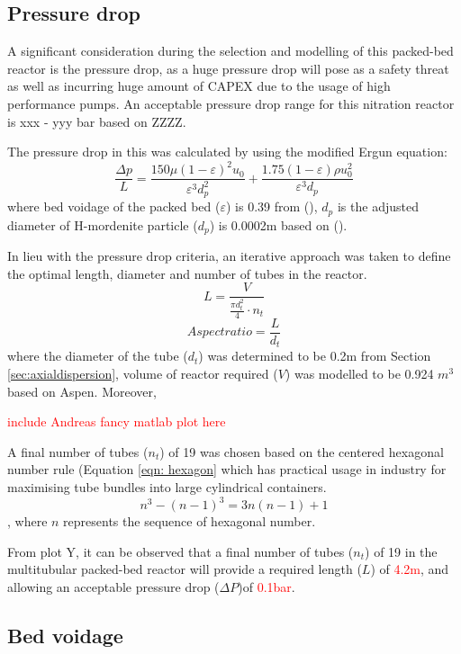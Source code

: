 \subsection{Pressure drop}

A significant consideration during the selection and modelling of this packed-bed reactor is the pressure drop, as a huge pressure drop will pose as a safety threat as well as incurring huge amount of CAPEX due to the usage of high performance pumps. An acceptable pressure drop range for this nitration reactor is xxx - yyy bar based on ZZZZ. 

The pressure drop in this was calculated by using the modified Ergun equation: 
\begin{equation}
    \frac{\Delta p}{L} = \frac{150 \mu (1- \varepsilon)^2 u_0}{\varepsilon^3 d_p^2} + \frac{1.75(1-\varepsilon)\rho u_0^2}{\varepsilon^3 d_p}
    \label{eqn:ergun}
\end{equation}
where bed voidage of the packed bed ($\varepsilon$) is 0.39 from (), $d_p$ is the adjusted diameter of H-mordenite particle ($d_p$) is 0.0002m based on (). 

In lieu with the pressure drop criteria, an iterative approach was taken to define the optimal length, diameter and number of tubes in the reactor. 
\begin{equation}
    L= \frac{V}{\frac{\pi d_t^2}{4}\cdot n_t}
    \label{eqn:pressuredrop}
\end{equation}
\begin{equation}
    Aspect ratio = \frac{L}{d_t}
    \label{eqn:aspectratio}
\end{equation}
where the diameter of the tube ($d_t$) was determined to be 0.2m from Section \ref{sec:axialdispersion}, volume of reactor required ($V$) was modelled to be 0.924 $m^3$ based on Aspen. Moreover, 

\textcolor{red}{include Andreas fancy matlab plot here}

A final number of tubes ($n_t$) of 19 was chosen based on the centered hexagonal number rule (Equation \ref{eqn: hexagon} which has practical usage in industry for maximising tube bundles into large cylindrical containers. 
\begin{equation}
    n^3 - (n-1)^3 = 3n(n-1)+1
    \label{eqn: hexagon}
\end{equation},
where $n$ represents the sequence of hexagonal number. 

From plot Y, it can be observed that a final number of tubes ($n_t$) of 19 in the multitubular packed-bed reactor will provide a required length ($L$) of \textcolor{red}{4.2m}, and allowing an acceptable pressure drop ($\Delta P$)of \textcolor{red}{0.1bar}.  

\subsection{Bed voidage}
